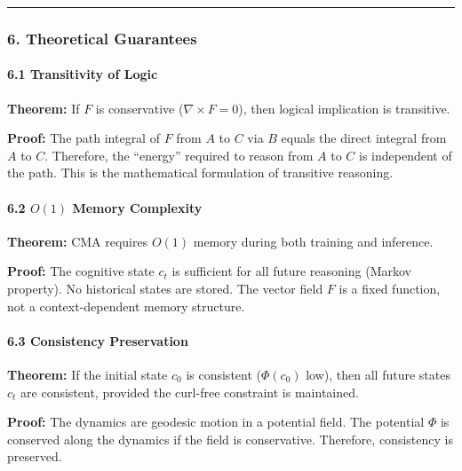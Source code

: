 \documentclass[
  11pt,
  a4paper,
]{article}
\begin{document}
\begin{center}\rule{0.5\linewidth}{0.5pt}\end{center}

\subsubsection{6. Theoretical
Guarantees}\label{theoretical-guarantees-1}

\paragraph{6.1 Transitivity of Logic}\label{transitivity-of-logic-1}

\textbf{Theorem:} If \(F\) is conservative (\(\nabla \times F = 0\)),
then logical implication is transitive.

\textbf{Proof:} The path integral of \(F\) from \(A\) to \(C\) via \(B\)
equals the direct integral from \(A\) to \(C\). Therefore, the
``energy'' required to reason from \(A\) to \(C\) is independent of the
path. This is the mathematical formulation of transitive reasoning.

\paragraph{\texorpdfstring{6.2 \(O(1)\) Memory
Complexity}{6.2 O(1) Memory Complexity}}\label{o1-memory-complexity}

\textbf{Theorem:} CMA requires \(O(1)\) memory during both training and
inference.

\textbf{Proof:} The cognitive state \(c_t\) is sufficient for all future
reasoning (Markov property). No historical states are stored. The vector
field \(F\) is a fixed function, not a context-dependent memory
structure.

\paragraph{6.3 Consistency Preservation}\label{consistency-preservation}

\textbf{Theorem:} If the initial state \(c_0\) is consistent
(\(\Phi(c_0)\) low), then all future states \(c_t\) are consistent,
provided the curl-free constraint is maintained.

\textbf{Proof:} The dynamics are geodesic motion in a potential field.
The potential \(\Phi\) is conserved along the dynamics if the field is
conservative. Therefore, consistency is preserved.
\end{document}
